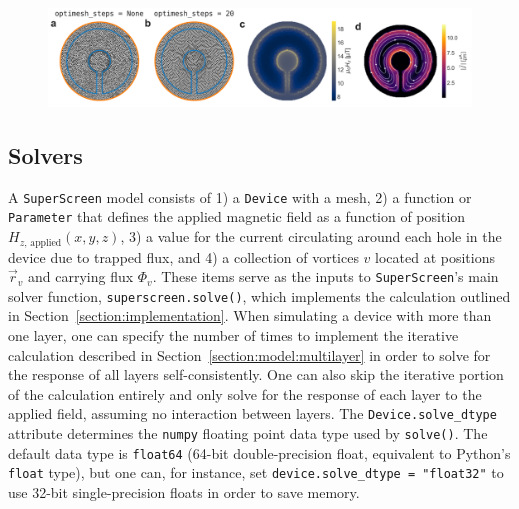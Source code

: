 \documentclass[final,3p,times]{elsarticle}
\newcommand{\inline}[1]{\texttt{#1}\xspace}
\newcommand{\SuperScreen}{\inline{SuperScreen}}
\newenvironment{code}{\captionsetup{type=listing}}{\hfill}
\begin{document}
\begin{figure}[h]
    \centering
    \includegraphics[width=\textwidth]{examples/images/ring_with_slit.pdf}
    \caption{}
    \label{fig:ring-with-slit}
\end{figure}

\subsection{Solvers}
\label{section:overview:solvers}

A \SuperScreen model consists of 1) a \inline{Device} with a mesh, 2) a function or \inline{Parameter} that defines the applied magnetic field as a function of position $H_{z,\,\mathrm{applied}}(x, y, z)$, 3) a value for the current circulating around each hole in the device due to trapped flux, and 4) a collection of vortices $v$ located at positions $\vec{r}_v$ and carrying flux $\Phi_v$. These items serve as the inputs to \SuperScreen's main solver function, \inline{superscreen.solve()}, which implements the calculation outlined in Section~\ref{section:implementation}. When simulating a device with more than one layer, one can specify the number of times to implement the iterative calculation described in Section~\ref{section:model:multilayer} in order to solve for the response of all layers self-consistently. One can also skip the iterative portion of the calculation entirely and only solve for the response of each layer to the applied field, assuming no interaction between layers. The \inline{Device.solve_dtype} attribute determines the \inline{numpy} floating point data type used by \inline{solve()}. The default data type is \inline{float64} (64-bit double-precision float, equivalent to Python's \inline{float} type), but one can, for instance, set \inline{device.solve_dtype = "float32"} to use 32-bit single-precision floats in order to save memory.


\end{document}
